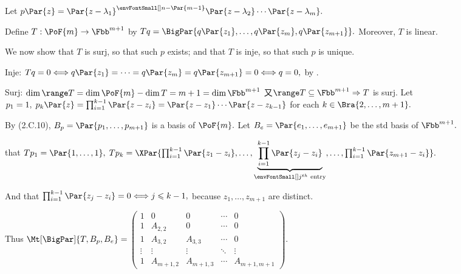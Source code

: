 Let $p\Par{z}=\Par{z-\lambda_1}^{{\envFontSmall[\scriptsize]n-\Par{m-1}}}\Par{z-\lambda_2}\cdots\Par{z-\lambda_m}.$\PfEnd
\SepLine

\par\quad
Define $T:\PoF{m}\rightarrow\Fbb^{m+1}$ by $Tq=\BigPar{q\Par{z_1},\dots,q\Par{z_m},q\Par{z_{m+1}}}.$ Moreover, $T$ is linear.\vspace{4pt}\par\quad
We now show that $T$ is surj, so that such $p$ exists;\; and that $T$ is inje, so that such $p$ is unique.\vspace{1pt}\par\quad
Inje: $Tq=0\Longleftrightarrow q\Par{z_1}=\dots=q\Par{z_m}=q\Par{z_{m+1}}=0\Longleftrightarrow q=0,$ by \TIPS.\vspace{1pt}\par\quad
Surj: $\dim\range T=\dim\PoF{m}-\dim\null T=m+1=\dim\Fbb^{m+1}$ 又$\range T\subseteq\Fbb^{m+1}\Rightarrow T$ is surj.\PfEnd\vspace{8pt}\quad
\Or Let $p_1=1,\;p_k\Par{z}=\prod_{i=1}^{k-1}\Par{z-z_i}=\Par{z-z_1}\cdots\Par{z-z_{k-1}}$ for each $k\in\Bra{2,\dots,m+1}.$\vspace{2pt}\par\quad
By (2.C.10), $B_p=\Par{p_1,\dots,p_{m+1}}$ is a basis of $\PoF{m}.$ Let $B_e=\Par{e_1,\dots,e_{m+1}}$ be the std basis of $\Fbb^{m+1}.$\vspace{4pt}\par\quad
\NOTICE that $Tp_1=\Par{1,\dots,1},\;Tp_k=\XPar{\prod_{i=1}^{k-1}\Par{z_1-z_i},\dots,\underbrace{\prod_{i=1}^{k-1}\Par{z_j-z_i}}_{\envFontSmall[\scriptsize]j^{th}\text{ entry}},\dots,\prod_{i=1}^{k-1}\Par{z_{m+1}-z_i}}.$\vspace{2pt}\par\quad
And that $\prod_{i=1}^{k-1}\Par{z_j-z_i}=0\Longleftrightarrow j\leqslant k-1,$ because $z_1,\dots,z_{m+1}$ are distinct.\vspace{4pt}\par\quad
Thus $\Mt[\BigPar]{T,B_p,B_e}=\,${\normalsize$\begin{pmatrix}
	1 & 0 & 0 & \cdots & 0\\
	1 & A_{2,2} & 0 & \cdots & 0\\
	1 & A_{3,2} & A_{3,3} & \cdots & 0\\
	\vdots & \vdots & \vdots & \ddots & \vdots\\
	1 & A_{m+1,2} & A_{m+1,3} & \cdots & A_{m+1,m+1}
\end{pmatrix}$}.\vspace{6pt}\par\quad
